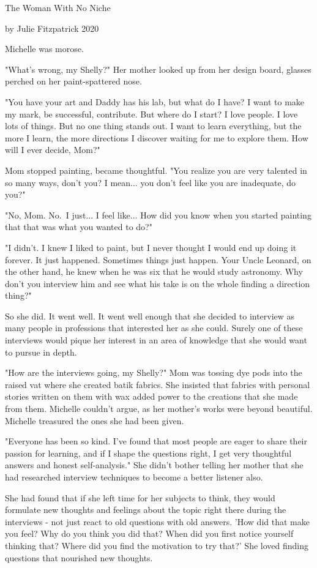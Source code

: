 {The Woman With No Niche}

by Julie Fitzpatrick 2020

Michelle was morose.

"What's wrong, my Shelly?" Her mother looked up from her design board,
glasses perched on her paint-spattered nose.

"You have your art and Daddy has his lab, but what do I have? I want to
make my mark, be successful, contribute. But where do I start? I love
people. I love lots of things. But no one thing stands out. I want to
learn everything, but the more I learn, the more directions I discover
waiting for me to explore them. How will I ever decide, Mom?"

Mom stopped painting, became thoughtful. "You realize you are very
talented in so many ways, don't you? I mean... you don't feel like you
are inadequate, do you?"

"No, Mom. No.~I just... I feel like... How did you know when you started
painting that that was what you wanted to do?"

"I didn't. I knew I liked to paint, but I never thought I would end up
doing it forever. It just happened. Sometimes things just happen. Your
Uncle Leonard, on the other hand, he knew when he was six that he would
study astronomy. Why don't you interview him and see what his take is on
the whole finding a direction thing?"

So she did. It went well. It went well enough that she decided to
interview as many people in professions that interested her as she
could. Surely one of these interviews would pique her interest in an
area of knowledge that she would want to pursue in depth.

"How are the interviews going, my Shelly?" Mom was tossing dye pods into
the raised vat where she created batik fabrics. She insisted that
fabrics with personal stories written on them with wax added power to
the creations that she made from them. Michelle couldn't argue, as her
mother's works were beyond beautiful. Michelle treasured the ones she
had been given.

"Everyone has been so kind. I've found that most people are eager to
share their passion for learning, and if I shape the questions right, I
get very thoughtful answers and honest self-analysis." She didn't bother
telling her mother that she had researched interview techniques to
become a better listener also.

She had found that if she left time for her subjects to think, they
would formulate new thoughts and feelings about the topic right there
during the interviews - not just react to old questions with old
answers. 'How did that make you feel? Why do you think you did that?
When did you first notice yourself thinking that? Where did you find the
motivation to try that?' She loved finding questions that nourished new
thoughts.


